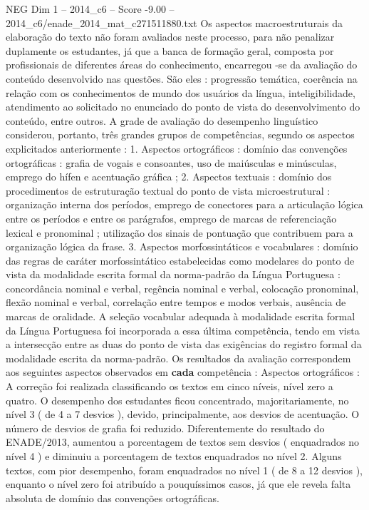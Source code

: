 \begin{textsample}{NEG Dim 1 – 2014\_c6 – Score -9.00 – 2014\_c6/enade\_2014\_mat\_c271511880.txt}
Os aspectos macroestruturais da elaboração do texto não foram avaliados neste processo, para não penalizar duplamente os estudantes, já que a banca de formação geral, composta por profissionais de diferentes áreas do conhecimento, encarregou -se da avaliação do conteúdo desenvolvido nas questões.
São eles : progressão temática, coerência na relação com os conhecimentos de mundo dos usuários da língua, inteligibilidade, atendimento ao solicitado no enunciado do ponto de vista do desenvolvimento do conteúdo, entre outros.
A grade de avaliação do desempenho linguístico considerou, portanto, três grandes grupos de competências, segundo os aspectos explicitados anteriormente : 1.
Aspectos ortográficos : domínio das convenções ortográficas : grafia de vogais e consoantes, uso de maiúsculas e minúsculas, emprego do hífen e acentuação gráfica ; 2.
Aspectos textuais : domínio dos procedimentos de estruturação textual do ponto de vista microestrutural : organização interna dos períodos, emprego de conectores para a articulação lógica entre os períodos e entre os parágrafos, emprego de marcas de referenciação lexical e pronominal ; utilização dos sinais de pontuação que contribuem para a organização lógica da frase. 3.
Aspectos morfossintáticos e vocabulares : domínio das regras de caráter morfossintático estabelecidas como modelares do ponto de vista da modalidade escrita formal da norma-padrão da Língua Portuguesa : concordância nominal e verbal, regência nominal e verbal, colocação pronominal, flexão nominal e verbal, correlação entre tempos e modos verbais, ausência de marcas de oralidade.
A seleção vocabular adequada à modalidade escrita formal da Língua Portuguesa foi incorporada a essa última competência, tendo em vista a intersecção entre as duas do ponto de vista das exigências do registro formal da modalidade escrita da norma-padrão.
Os resultados da avaliação correspondem aos seguintes aspectos observados em \textbf{cada} competência : Aspectos ortográficos : A correção foi realizada classificando os textos em cinco níveis, nível zero a quatro.
O desempenho dos estudantes ficou concentrado, majoritariamente, no nível 3 ( de 4 a 7 desvios ), devido, principalmente, aos desvios de acentuação.
O número de desvios de grafia foi reduzido.
Diferentemente do resultado do ENADE/2013, aumentou a porcentagem de textos sem desvios ( enquadrados no nível 4 ) e diminuiu a porcentagem de textos enquadrados no nível 2.
Alguns textos, com pior desempenho, foram enquadrados no nível 1 ( de 8 a 12 desvios ), enquanto o nível zero foi atribuído a pouquíssimos casos, já que ele revela falta absoluta de domínio das convenções ortográficas.

\end{textsample}

